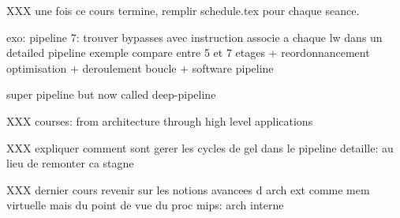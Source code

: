 XXX une fois ce cours termine, remplir schedule.tex pour chaque seance.

exo: pipeline 7: trouver bypasses avec instruction associe a chaque
     lw dans un detailed pipeline
exemple compare entre 5 et 7 etages + reordonnancement optimisation
+ deroulement boucle + software pipeline

super pipeline but now called deep-pipeline

XXX courses: from architecture through high level applications

XXX expliquer comment sont gerer les cycles de gel dans le pipeline
detaille: au lieu de remonter ca stagne

XXX dernier cours revenir sur les notions avancees d arch ext
    comme mem virtuelle mais du point de vue du proc mips: arch interne
